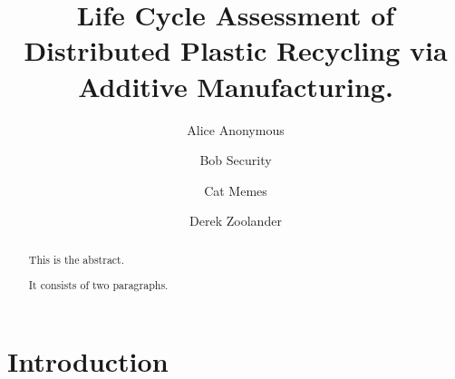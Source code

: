 \documentclass[]{elsarticle} %
\begin{document}
\begin{frontmatter}

  \title{Life Cycle Assessment of Distributed Plastic Recycling via Additive Manufacturing.}
    \author[Some Institute of Technology]{Alice Anonymous%
  }
    \author[Another University]{Bob Security%
  }
    \author[Another University]{Cat Memes%
  }
    \author[Some Institute of Technology]{Derek Zoolander%
  }
  
  \begin{abstract}
  This is the abstract.

  It consists of two paragraphs.
  \end{abstract}
  
 \end{frontmatter}

\hypertarget{introduction}{%
\section{Introduction}\label{introduction}}
\end{document}

